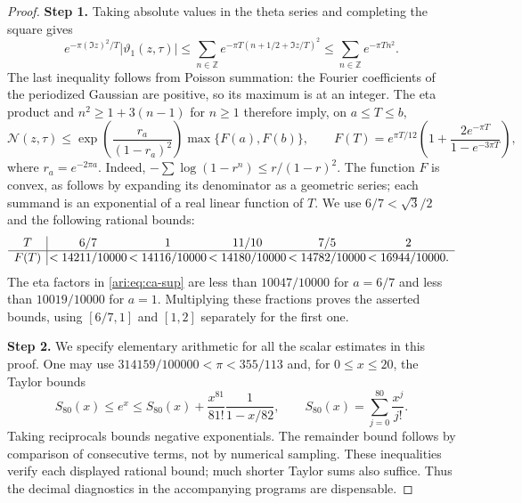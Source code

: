 \documentclass[11pt,a4paper]{article}
\theoremstyle{plain}
\theoremstyle{definition}
\newcommand{\Z}{\mathbb Z}
\begin{document}
\begin{proof}
\noindent\textbf{Step 1.} Taking absolute values in the theta series and completing the square
gives
\[
 e^{-\pi(\Im z)^2/T}|\vartheta_1(z,\tau)|
 \le\sum_{n\in\Z}
 e^{-\pi T(n+1/2+\Im z/T)^2}
 \le\sum_{n\in\Z}e^{-\pi Tn^2}.
\]
The last inequality follows from Poisson summation: the Fourier
coefficients of the periodized Gaussian are positive, so its maximum
is at an integer. The eta product and $n^2\ge1+3(n-1)$ for $n\ge1$
therefore imply, on $a\le T\le b$,
\begin{equation}\label{ari:eq:ca-sup}
 \mathcal N(z,\tau)\le
 \exp\!\left(\frac{r_a}{(1-r_a)^2}\right)
 \max\{F(a),F(b)\},\qquad
 F(T)=e^{\pi T/12}
 \left(1+\frac{2e^{-\pi T}}{1-e^{-3\pi T}}\right),
\end{equation}
where $r_a=e^{-2\pi a}$. Indeed,
$-\sum\log(1-r^n)\le r/(1-r)^2$. The function $F$ is convex,
as follows by expanding its denominator as a geometric series;
each summand is an exponential of a real linear function of $T$.
We use $6/7<\sqrt3/2$ and the following rational bounds:
\[
\begin{array}{c|@{\,}c@{\,}c@{\,}c@{\,}c@{\,}c}
T&6/7&1&11/10&7/5&2\\ \hline
F(T)&<14211/10000&<14116/10000&<14180/10000&<14782/10000&<16944/10000.
\end{array}
\]
The eta factors in \eqref{ari:eq:ca-sup} are less than $10047/10000$
for $a=6/7$ and less than $10019/10000$ for $a=1$.
Multiplying these fractions proves the asserted bounds, using
$[6/7,1]$ and $[1,2]$ separately for the first one.


\noindent\textbf{Step 2.} We specify elementary arithmetic for all the scalar estimates in
this proof. One may use $314159/100000<\pi<355/113$ and, for
$0\le x\le20$, the Taylor bounds
\begin{equation}\label{ari:eq:ca-exp}
 S_{80}(x)\le e^x\le
 S_{80}(x)+\frac{x^{81}}{81!}\frac1{1-x/82},
 \qquad S_{80}(x)=\sum_{j=0}^{80}\frac{x^j}{j!}.
\end{equation}
Taking reciprocals bounds negative exponentials. The remainder
bound follows by comparison of consecutive terms, not by numerical
sampling. These inequalities verify each displayed rational bound;
much shorter Taylor sums also suffice. Thus the decimal diagnostics
in the accompanying programs are dispensable.



\end{proof}
\end{document}
